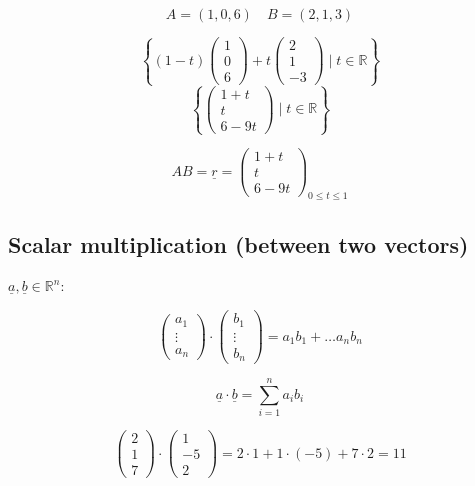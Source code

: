 \documentclass[00_complete]{subfiles}
\begin{document}
\begin{example}
$$A=(1,0,6) \quad B=(2,1,3)$$


$$
    \left\{(1-t)\begin{pmatrix}
        1\\0\\6
    \end{pmatrix}+t \begin{pmatrix}
        2\\1\\-3
    \end{pmatrix}\;|\; t \in \mathbb{R}\right\}
$$
$$
    \left\{\begin{pmatrix}
        1+t\\t\\6-9t
    \end{pmatrix} \;|\; t \in \mathbb{R} \right\}
$$

$$
    AB=\underline r = \begin{pmatrix}
        1+t\\t\\6-9t
    \end{pmatrix}_{0 \leq t \leq 1}
$$
\end{example}
\subsection{Scalar multiplication (between two vectors)}

$\underline a, \underline b \in \mathbb{R}^n$:

$$\begin{pmatrix}
    a_1 \\ \vdots \\ a_n
\end{pmatrix} \cdot \begin{pmatrix}
    b_1 \\ \vdots \\ b_n
\end{pmatrix} = a_1 b_1 + \dots a_n b_n$$

$$\underline a \cdot \underline b = \sum_{i=1}^n a_i b_i$$

\begin{example}
$$\begin{pmatrix}
    2\\1\\7
\end{pmatrix} \cdot \begin{pmatrix}
    1\\-5\\2
\end{pmatrix} = 2 \cdot 1 + 1 \cdot (-5) + 7 \cdot 2 = 11$$
\end{example}
\end{document}
